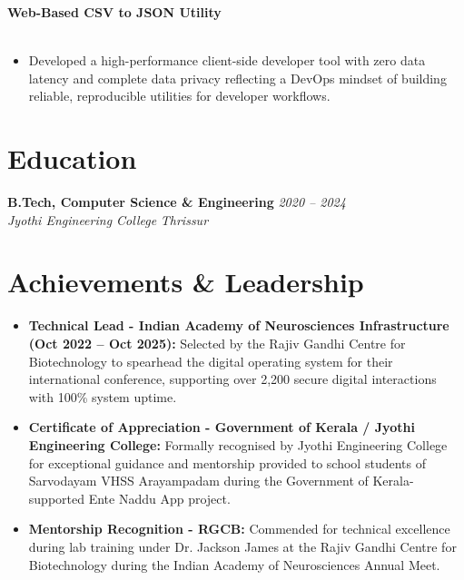 \documentclass[10pt,a4paper]{article}
\newcommand{\jobheading}[4]{
  \noindent\textbf{#1} \hfill \textit{#2} \\
  \noindent\textit{#3} \hfill \textit{#4} \\
  \vspace{-4pt}
}
\newcommand{\projectheading}[3]{
  \noindent\textbf{#1} \hfill \textit{#2} \\
  \noindent\textit{#3} \\
  \vspace{-4pt}
}
\begin{document}
\vspace{4pt}

\projectheading{Web-Based CSV to JSON Utility}{}{}
\begin{itemize}[label={$\bullet$}]
    \item Developed a high-performance client-side developer tool with zero data latency and complete data privacy reflecting a DevOps mindset of building reliable, reproducible utilities for developer workflows.
\end{itemize}

\section*{Education}
\jobheading{B.Tech, Computer Science \& Engineering}{2020 -- 2024}{Jyothi Engineering College}{Thrissur}

\section*{Achievements \& Leadership}
\begin{itemize}[label={$\bullet$}]
    \item \textbf{Technical Lead - Indian Academy of Neurosciences Infrastructure (Oct 2022 -- Oct 2025):} Selected by the Rajiv Gandhi Centre for Biotechnology to spearhead the digital operating system for their international conference, supporting over 2,200 secure digital interactions with 100\% system uptime.
    \item \textbf{Certificate of Appreciation - Government of Kerala / Jyothi Engineering College:} Formally recognised by Jyothi Engineering College for exceptional guidance and mentorship provided to school students of Sarvodayam VHSS Arayampadam during the Government of Kerala-supported Ente Naddu App project.
    \item \textbf{Mentorship Recognition - RGCB:} Commended for technical excellence during lab training under Dr. Jackson James at the Rajiv Gandhi Centre for Biotechnology during the Indian Academy of Neurosciences Annual Meet.
\end{itemize}
\end{document}
